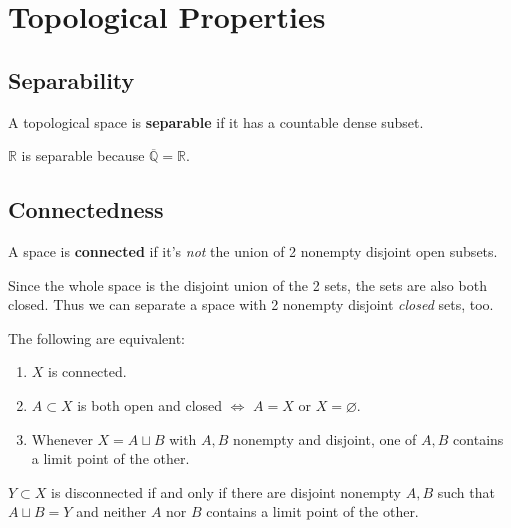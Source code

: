 \documentclass[twoside,10pt]{report}
\begin{document}
\chapter{Topological Properties}


\section{Separability}

\begin{defn}[]
A topological space is \textbf{separable} if it has a countable dense subset.
\end{defn}

\begin{ex}[]
$\mathbb{R}$ is separable because $\overline{\mathbb{Q}} =\mathbb{R}$.
\end{ex}



\section{Connectedness}

\begin{defn}[]
	A space is \textbf{connected} if it's \textit{not} the union of 2 nonempty disjoint open subsets.
\end{defn}

Since the whole space is the disjoint union of the 2 sets, the sets are also both closed. Thus we can separate a space with 2 nonempty disjoint \textit{closed} sets, too.

\begin{thrm}[]
The following are equivalent:
\begin{enumerate}
	\item $X$ is connected.
	\item $A \subset X$ is both open and closed $\iff$ $A=X$ or $X=\varnothing$.
	\item Whenever $X = A \sqcup B$ with $A,B$ nonempty and disjoint, one of $A,B$ contains a limit point of the other.
\end{enumerate}
\end{thrm}

\begin{prop}
	$Y \subset X$ is disconnected if and only if there are disjoint nonempty $A,B$ such that $A \sqcup B = Y$ and neither $A$ nor $B$ contains a limit point of the other.
\end{prop}
\end{document}
